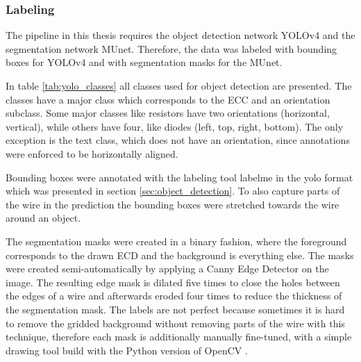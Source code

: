 \subsubsection{Labeling}

The pipeline in this thesis requires the object detection network \ac{YOLOv4} and the segmentation network \ac{MUnet}.
Therefore, the data was labeled with bounding boxes for \ac{YOLOv4} and with segmentation masks for the \ac{MUnet}.

In table \ref{tab:yolo_classes} all classes used for object detection are presented.
The classes have a major class which corresponds to the \ac{ECC} and an orientation subclass.
Some major classes like resistors have two orientations (horizontal, vertical), while others have four, like diodes (left, top, right, bottom).
The only exception is the text class, which does not have an orientation, since annotations were enforced to be horizontally aligned.

Bounding boxes were annotated with the labeling tool labelme \cite{labelme} in the yolo format which was presented in section \ref{sec:object_detection}.
To also capture parts of the wire in the prediction the bounding boxes were stretched towards the wire around an object.

The segmentation masks were created in a binary fashion, where the foreground corresponds to the drawn \ac{ECD} and the background is everything else.
The masks were created semi-automatically by applying a Canny Edge Detector \cite{canny_edge} on the image.
The resulting edge mask is dilated five times to close the holes between the edges of a wire and afterwards eroded four times to reduce the thickness of the segmentation mask.
The labels are not perfect because sometimes it is hard to remove the gridded background without removing parts of the wire with this technique, therefore each mask is additionally manually fine-tuned, with a simple drawing tool build with the Python version of OpenCV \cite{opencv}.


